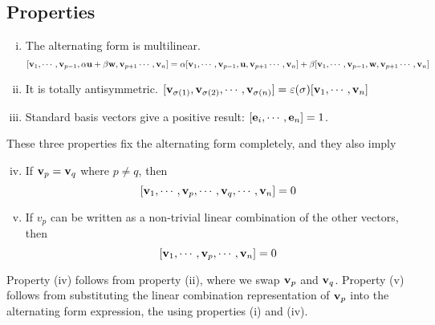 \subsection{Properties}
\begin{enumerate}[(i)]
	\item The alternating form is multilinear.
	      \[ [ \vb v_1, \cdots, \vb v_{p-1}, \alpha \vb u + \beta \vb w, \vb v_{p+1} \cdots, \vb v_n ] = \alpha [ \vb v_1, \cdots, \vb v_{p-1}, \vb u, \vb v_{p+1} \cdots, \vb v_n ] + \beta [ \vb v_1, \cdots, \vb v_{p-1}, \vb w, \vb v_{p+1} \cdots, \vb v_n ] \]
	\item It is totally antisymmetric. $[ \vb v_{\sigma(1)}, \vb v_{\sigma(2)}, \cdots, \vb v_{\sigma(n)} ] = \varepsilon(\sigma) [ \vb v_1, \cdots, \vb v_n ]$
	\item Standard basis vectors give a positive result: $[\vb e_i, \cdots, \vb e_n] = 1$.
\end{enumerate}
These three properties fix the alternating form completely, and they also imply
\begin{enumerate}[(i)]
	\setcounter{enumi}{3}
	\item If $\vb v_p = \vb v_q$ where $p \neq q$, then
	      \[ [\vb v_1, \cdots, \vb v_p, \cdots, \vb v_q, \cdots, \vb v_n ] = 0 \]
	\item If $v_p$ can be written as a non-trivial linear combination of the other vectors, then
	      \[ [\vb v_1, \cdots, \vb v_p, \cdots, \vb v_n ] = 0 \]
\end{enumerate}
Property (iv) follows from property (ii), where we swap $\vb v_p$ and $\vb v_q$. Property (v) follows from substituting the linear combination representation of $\vb v_p$ into the alternating form expression, the using properties (i) and (iv).
